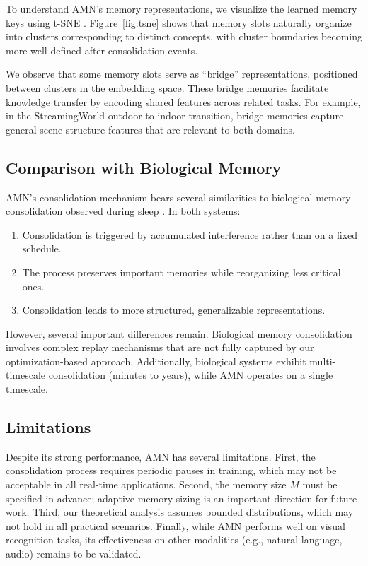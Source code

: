 \documentclass[11pt]{article}
\begin{document}
To understand AMN's memory representations, we visualize the learned memory keys using t-SNE \citep{maaten2008visualizing}. Figure~\ref{fig:tsne} shows that memory slots naturally organize into clusters corresponding to distinct concepts, with cluster boundaries becoming more well-defined after consolidation events.

We observe that some memory slots serve as ``bridge'' representations, positioned between clusters in the embedding space. These bridge memories facilitate knowledge transfer by encoding shared features across related tasks. For example, in the StreamingWorld outdoor-to-indoor transition, bridge memories capture general scene structure features that are relevant to both domains.

\subsection{Comparison with Biological Memory}

AMN's consolidation mechanism bears several similarities to biological memory consolidation observed during sleep \citep{walker2017sleep}. In both systems:
\begin{enumerate}
    \item Consolidation is triggered by accumulated interference rather than on a fixed schedule.
    \item The process preserves important memories while reorganizing less critical ones.
    \item Consolidation leads to more structured, generalizable representations.
\end{enumerate}

However, several important differences remain. Biological memory consolidation involves complex replay mechanisms that are not fully captured by our optimization-based approach. Additionally, biological systems exhibit multi-timescale consolidation (minutes to years), while AMN operates on a single timescale.

\subsection{Limitations}

Despite its strong performance, AMN has several limitations. First, the consolidation process requires periodic pauses in training, which may not be acceptable in all real-time applications. Second, the memory size $M$ must be specified in advance; adaptive memory sizing is an important direction for future work. Third, our theoretical analysis assumes bounded distributions, which may not hold in all practical scenarios. Finally, while AMN performs well on visual recognition tasks, its effectiveness on other modalities (e.g., natural language, audio) remains to be validated.
\end{document}
